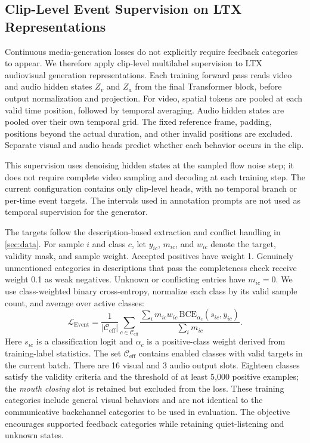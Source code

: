 \subsection{Clip-Level Event Supervision on LTX Representations}
Continuous media-generation losses do not explicitly require feedback categories to appear. We therefore apply clip-level multilabel supervision to LTX audiovisual generation representations. Each training forward pass reads video and audio hidden states $Z_v$ and $Z_a$ from the final Transformer block, before output normalization and projection. For video, spatial tokens are pooled at each valid time position, followed by temporal averaging. Audio hidden states are pooled over their own temporal grid. The fixed reference frame, padding, positions beyond the actual duration, and other invalid positions are excluded. Separate visual and audio heads predict whether each behavior occurs in the clip.

This supervision uses denoising hidden states at the sampled flow noise step; it does not require complete video sampling and decoding at each training step. The current configuration contains only clip-level heads, with no temporal branch or per-time event targets. The intervals used in annotation prompts are not used as temporal supervision for the generator.

The targets follow the description-based extraction and conflict handling in \cref{sec:data}. For sample $i$ and class $c$, let $y_{ic}$, $m_{ic}$, and $w_{ic}$ denote the target, validity mask, and sample weight. Accepted positives have weight 1. Genuinely unmentioned categories in descriptions that pass the completeness check receive weight 0.1 as weak negatives. Unknown or conflicting entries have $m_{ic}=0$. We use class-weighted binary cross-entropy, normalize each class by its valid sample count, and average over active classes:
\begin{equation}
\mathcal L_{\mathrm{Event}} =
\frac{1}{|\mathcal C_{\mathrm{eff}}|}
\sum_{c\in\mathcal C_{\mathrm{eff}}}
\frac{\sum_i m_{ic} w_{ic}\,\mathrm{BCE}_{\alpha_c}(s_{ic},y_{ic})}
{\sum_i m_{ic}}.
\label{eq:event}
\end{equation}
Here $s_{ic}$ is a classification logit and $\alpha_c$ is a positive-class weight derived from training-label statistics. The set $\mathcal C_{\mathrm{eff}}$ contains enabled classes with valid targets in the current batch. There are 16 visual and 3 audio output slots. Eighteen classes satisfy the validity criteria and the threshold of at least 5,000 positive examples; the \emph{mouth closing} slot is retained but excluded from the loss. These training categories include general visual behaviors and are not identical to the communicative backchannel categories to be used in evaluation. The objective encourages supported feedback categories while retaining quiet-listening and unknown states.

